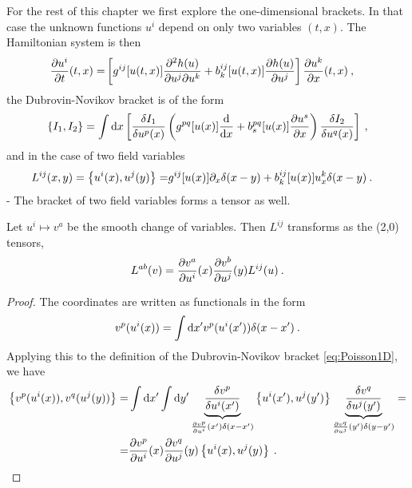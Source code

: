 For the rest of this chapter we first explore the one-dimensional brackets. In that case the unknown functions $u^i$ depend on only two variables $(t,x)$. The Hamiltonian system is then
\begin{align}
    \frac{\partial u^i}{\partial t} (t,x) =&
    \left[ g^{ij} [u(t,x)] \frac{\partial^2 h(u)}{\partial u^j \partial u^k} + b_k^{ij} [u(t,x)] \frac{\partial h(u)}{\partial u^j} \right] \frac{\partial u^k}{\partial x}(t,x) \:, 
\end{align}
the Dubrovin-Novikov bracket is of the form
\begin{align}
    \left \lbrace I_1,I_2 \right \rbrace = \int \mathrm{d} x
    \left[ \frac{\delta I_1}{\delta u^p(x)} \left( g^{pq}[u(x)] \frac{\mathrm{d}}{\mathrm{d}x} + b^{pq}_s[u(x)] \frac{\partial u^s}{\partial x} \right) \frac{\delta I_2}{\delta u^q(x)} \right] \:, \label{eq:Dubrovin-Novikov bracket 1D}
\end{align}
and in the case of two field variables
\begin{align}
    \label{eq:Poisson1D}
    L^{ij}(x,y) = \left \lbrace u^i(x), u^j(y) \right \rbrace =& g^{ij} [u(x)] \partial_x \delta(x-y) + b_k^{ij} [u(x)] u^k_x \delta(x-y) \:. 
\end{align}
-
The bracket of two field variables forms a tensor as well.

\begin{proposition}[Transformation of $L^{ij}$]
    Let $u^i \mapsto v^a$ be the smooth change of variables. Then $L^{ij}$ transforms as the (2,0) tensors,
    \begin{align}
        L^{ab}(v) = \frac{\partial v^a}{\partial u^i}(x) \frac{\partial v^b}{\partial u^j}(y) L^{ij}(u) \:. \label{eq:transformace-zavorka}
    \end{align}
\end{proposition}
\begin{proof}
    The coordinates are written as functionals in the form
    \begin{align}
        v^p(u^i(x)) = \int \mathrm{d} x' v^p(u^i(x')) \delta (x-x') \:.
    \end{align}
    Applying this to the definition of the Dubrovin-Novikov bracket \eqref{eq:Poisson1D}, we have
    \begin{align}
        \left \lbrace v^p(u^i(x)),v^q(u^j(y)) \right \rbrace 
        =& \int \mathrm{d} x' \int \mathrm{d} y' \underbrace{\frac{\delta v^p}{\delta u^i(x')} }_{\frac{\partial v^p}{\partial u^i}(x') \delta(x-x')} \left \lbrace u^i(x'),u^j(y') \right \rbrace \underbrace{\frac{\delta v^q}{\delta u^j(y')} }_{\frac{\partial v^q}{\partial u^j}(y') \delta(y-y')}
        = \\ =& \frac{\partial v^p}{\partial u^i}(x) \frac{\partial v^q}{\partial u^j}(y) \left \lbrace u^i(x),u^j(y) \right \rbrace \:.
    \end{align}
\end{proof}

